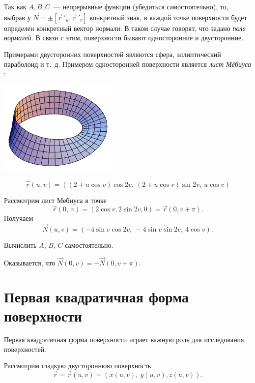 \documentclass[../../main.tex]{subfiles}
\begin{document}
Так как $A, B, C$~--- непрерывные функции (убедиться самостоятельно), то, 
выбрав у $\vec{N} = \pm\left[ \vec r\,'_u, \vec r\,'_v \right]$ конкретный 
знак, в каждой точке поверхности будет определен конкретный вектор нормали. В 
таком случае говорят, что задано \emph{поле нормалей}. В связи с этим, 
поверхности бывают односторонние и двусторонние.

Примерами двусторонних поверхностей являются сфера, эллиптический параболоид и т.~д. Примером односторонней поверхности является \emph{лист Мёбиуса} :

\begin{center}
\includegraphics[scale = 0.5]{lec22_0.png}
\end{center}

\[\vec{r}(u, v) = ((2 + u\cos v)\cos2v, \ (2 + u\cos v)\sin2v, \ u\cos v)\]

Рассмотрим лист Мебиуса в точке
\[\vec{r}(0, \ v) = (2\cos v, 2\sin2v, 0) = \vec{r}(0, v + \pi).\]
Получаем
\[\vec{N}(u, v) = (-4\sin v\cos2v, \ -4\sin v\sin2v, \ 4\cos v).\] 

\begin{exc}
 Вычислить $A$, $B$, $C$ самостоятельно.
\end{exc}

\bigskip

Оказывается, что
$\vec{N}(0, v) = -\vec{N}(0, v + \pi).$

\section{Первая квадратичная форма поверхности}

Первая квадратичная форма поверхности играет важную роль для исследования поверхностей.

Рассмотрим гладкую двустороннюю поверхность \[\vec{r} = \vec{r}(u,  v) = 
(x(u,  v), \ y(u,  v), z(u,  v)).\]
\end{document}
